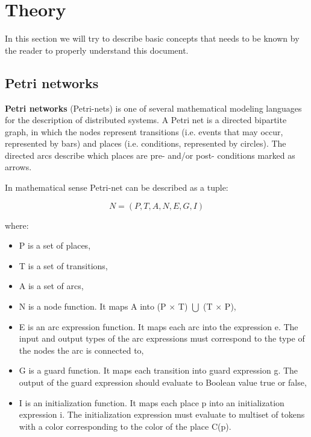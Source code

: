 \documentclass[a4paper]{article}
\begin{document}
\clearpage

%
\section{Theory}
\label{cha:theory}

In this section we will try to describe basic concepts that needs to be known by the reader to properly understand this document.

\subsection{Petri networks}
\label{sec:petriNetworks}

\textbf{Petri networks} (Petri-nets) is one of several mathematical modeling languages for the description of distributed systems. A Petri net is a directed bipartite graph, in which the nodes represent transitions (i.e. events that may occur, represented by bars) and places (i.e. conditions, represented by circles). The directed arcs describe which places are pre- and/or post- conditions marked  as arrows. \cite{Art3}

In mathematical sense Petri-net can be described as a tuple:

\begin{equation}
N = ( P, T, A, N, E, G, I )
\end{equation}

where:
\begin{itemize}
	\setlength{\itemsep}{1pt}
	\setlength{\parskip}{0pt}
	\setlength{\parsep}{0pt}
\item P is a set of places,
\item T is a set of transitions,
\item A is a set of arcs,
\item N is a node function. It maps A into (P $\times$ T) $\bigcup$ (T $\times$ P),
\item E is an arc expression function. It maps each arc into the expression e. The input and output types of the arc expressions must correspond to the type of the nodes the arc is connected to,
\item G is a guard function. It maps each transition into guard expression g. The output of the guard expression should evaluate to Boolean value true or false,
\item I is an initialization function. It maps each place p into an initialization expression i. The initialization expression must evaluate to multiset of tokens with a color corresponding to the color of the place C(p).\\
\end{itemize}
\end{document}
